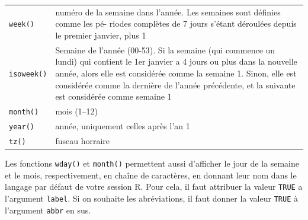\documentclass[
  11pt,
]{book}
\numberwithin{equation}{section}
\numberwithin{countremarque}{section}
\begin{document}
\begin{longtable}[]{@{}ll@{}}
\begin{minipage}[t]{0.43\columnwidth}\raggedright
\texttt{week()}\strut
\end{minipage} & \begin{minipage}[t]{0.51\columnwidth}\raggedright
numéro de la semaine dans l'année. Les semaines sont définies comme les pé- riodes complètes de 7 jours s'étant déroulées depuis le premier janvier, plus 1\strut
\end{minipage}\tabularnewline
\begin{minipage}[t]{0.43\columnwidth}\raggedright
\texttt{isoweek()}\strut
\end{minipage} & \begin{minipage}[t]{0.51\columnwidth}\raggedright
Semaine de l'année (00-53). Si la semaine (qui commence un lundi) qui contient le 1er janvier a 4 jours ou plus dans la nouvelle année, alors elle est considérée comme la semaine 1. Sinon, elle est considérée comme la dernière de l'année précédente, et la suivante est considérée comme semaine 1\strut
\end{minipage}\tabularnewline
\begin{minipage}[t]{0.43\columnwidth}\raggedright
\texttt{month()}\strut
\end{minipage} & \begin{minipage}[t]{0.51\columnwidth}\raggedright
mois (1--12)\strut
\end{minipage}\tabularnewline
\begin{minipage}[t]{0.43\columnwidth}\raggedright
\texttt{year()}\strut
\end{minipage} & \begin{minipage}[t]{0.51\columnwidth}\raggedright
année, uniquement celles après l'an 1\strut
\end{minipage}\tabularnewline
\begin{minipage}[t]{0.43\columnwidth}\raggedright
\texttt{tz()}\strut
\end{minipage} & \begin{minipage}[t]{0.51\columnwidth}\raggedright
fuseau horraire\strut
\end{minipage}\tabularnewline
\bottomrule
\end{longtable}

Les fonctions \texttt{wday()} et \texttt{month()} permettent aussi d'afficher le jour de la semaine et le mois, respectivement, en chaîne de caractères, en donnant leur nom dans le langage par défaut de votre session R. Pour cela, il faut attribuer la valeur \texttt{TRUE} a l'argument \texttt{label}. Si on souhaite les abréviations, il faut donner la valeur \texttt{TRUE} à l'argument \texttt{abbr} en sus.
\end{document}
